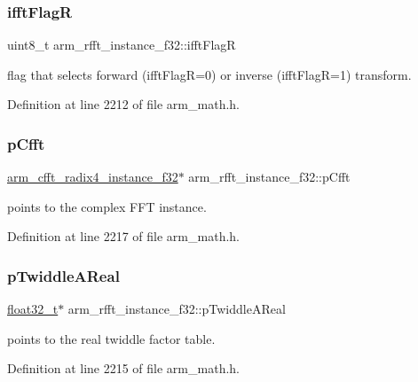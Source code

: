 \subsubsection{\texorpdfstring{ifft\+FlagR}{ifftFlagR}}
{\footnotesize\ttfamily uint8\+\_\+t arm\+\_\+rfft\+\_\+instance\+\_\+f32\+::ifft\+FlagR}

flag that selects forward (ifft\+FlagR=0) or inverse (ifft\+FlagR=1) transform. 

Definition at line 2212 of file arm\+\_\+math.\+h.

\mbox{\label{structarm__rfft__instance__f32_a9f47ba9f50c81e4445ae3827b981bc05}} 
\subsubsection{\texorpdfstring{p\+Cfft}{pCfft}}
{\footnotesize\ttfamily \hyperlink{structarm__cfft__radix4__instance__f32}{arm\+\_\+cfft\+\_\+radix4\+\_\+instance\+\_\+f32}$\ast$ arm\+\_\+rfft\+\_\+instance\+\_\+f32\+::p\+Cfft}

points to the complex F\+FT instance. 

Definition at line 2217 of file arm\+\_\+math.\+h.

\mbox{\label{structarm__rfft__instance__f32_a534cc7e6e9b3e3dd022fad611c762142}} 
\subsubsection{\texorpdfstring{p\+Twiddle\+A\+Real}{pTwiddleAReal}}
{\footnotesize\ttfamily \hyperlink{arm__math_8h_a4611b605e45ab401f02cab15c5e38715}{float32\+\_\+t}$\ast$ arm\+\_\+rfft\+\_\+instance\+\_\+f32\+::p\+Twiddle\+A\+Real}

points to the real twiddle factor table. 

Definition at line 2215 of file arm\+\_\+math.\+h.

\mbox{\label{structarm__rfft__instance__f32_a23543ecfd027fea2477fe1eea23c3c4d}} 
